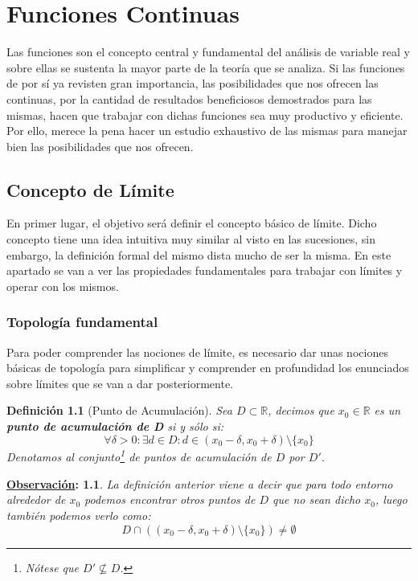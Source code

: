 \documentclass[10pt,a4paper,openright]{book}
\theoremstyle{break}
\newtheorem*{defi}{Definición}
\newtheorem*{obs}{\underline{Observación}:}
\begin{document}
\chapter{Funciones Continuas}
Las funciones son el concepto central y fundamental del análisis de variable real y sobre ellas se sustenta la mayor parte de la teoría que se analiza. Si las funciones de por sí ya revisten gran importancia, las posibilidades que nos ofrecen las continuas, por la cantidad de resultados beneficiosos demostrados para las mismas, hacen que trabajar con dichas funciones sea muy productivo y eficiente. Por ello, merece la pena hacer un estudio exhaustivo de las mismas para manejar bien las posibilidades que nos ofrecen.

\section{Concepto de Límite}
En primer lugar, el objetivo será definir el concepto básico de límite. Dicho concepto tiene una idea intuitiva muy similar al visto en las sucesiones, sin embargo, la definición formal del mismo dista mucho de ser la misma. En este apartado se van a ver las propiedades fundamentales para trabajar con límites y operar con los mismos.

\subsection{Topología fundamental}
Para poder comprender las nociones de límite, es necesario dar unas nociones básicas de topología para simplificar y comprender en profundidad los enunciados sobre límites que se van a dar posteriormente.

\begin{defi}[Punto de Acumulación]
Sea $D\subset \mathbb R$, decimos que $x_0\in \mathbb R$ es un \textbf{punto de acumulación de D} si y sólo si:
$$\forall \delta>0: \exists d\in D: d\in (x_0-\delta, x_0+\delta)\setminus\{x_0\}$$
Denotamos al conjunto\footnote{Nótese que $D'\nsubseteq D$.} de puntos de acumulación de $D$ por $D'$.
\end{defi}

\begin{obs}
La definición anterior viene a decir que para todo entorno alrededor de $x_0$ podemos encontrar otros puntos de $D$ que no sean dicho $x_0$, luego también podemos verlo como:
$$D\cap \left((x_0-\delta, x_0+\delta)\setminus \{x_0\}\right)\neq \emptyset$$
\end{obs}
\end{document}
